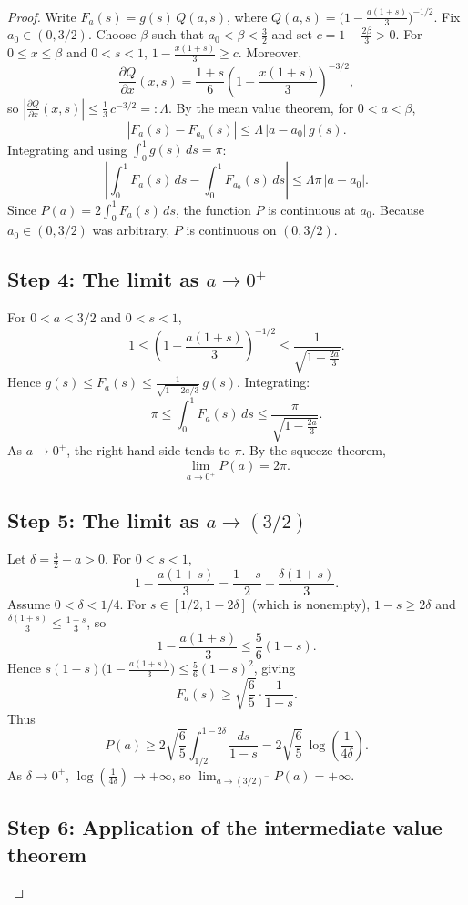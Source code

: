 \documentclass{article}
\begin{document}
\begin{proof}
Write $F_a(s) = g(s)\,Q(a,s)$, where $Q(a,s) = \bigl(1 - \frac{a(1+s)}{3}\bigr)^{-1/2}$. Fix $a_0 \in (0,3/2)$. Choose $\beta$ such that $a_0 < \beta < \frac{3}{2}$ and set $c = 1 - \frac{2\beta}{3} > 0$. For $0 \le x \le \beta$ and $0 < s < 1$, $1 - \frac{x(1+s)}{3} \ge c$. Moreover,
\[
\frac{\partial Q}{\partial x}(x,s) = \frac{1+s}{6}\left(1 - \frac{x(1+s)}{3}\right)^{-3/2},
\]
so $\left|\frac{\partial Q}{\partial x}(x,s)\right| \le \frac{1}{3}\,c^{-3/2} =: \Lambda$. By the mean value theorem, for $0 < a < \beta$,
\[
|F_a(s) - F_{a_0}(s)| \le \Lambda\,|a - a_0|\,g(s).
\]
Integrating and using $\int_0^1 g(s)\,ds = \pi$:
\[
\left|\int_0^1 F_a(s)\,ds - \int_0^1 F_{a_0}(s)\,ds\right| \le \Lambda\pi\,|a - a_0|.
\]
Since $P(a) = 2\int_0^1 F_a(s)\,ds$, the function $P$ is continuous at $a_0$. Because $a_0 \in (0,3/2)$ was arbitrary, $P$ is continuous on $(0,3/2)$.

\subsection*{Step 4: The limit as $a \to 0^+$}

For $0 < a < 3/2$ and $0 < s < 1$,
\[
1 \le \left(1 - \frac{a(1+s)}{3}\right)^{-1/2} \le \frac{1}{\sqrt{1 - \frac{2a}{3}}}.
\]
Hence $g(s) \le F_a(s) \le \frac{1}{\sqrt{1 - 2a/3}}\,g(s)$. Integrating:
\[
\pi \le \int_0^1 F_a(s)\,ds \le \frac{\pi}{\sqrt{1 - \frac{2a}{3}}}.
\]
As $a \to 0^+$, the right-hand side tends to $\pi$. By the squeeze theorem,
\[
\lim_{a \to 0^+} P(a) = 2\pi.
\]

\subsection*{Step 5: The limit as $a \to (3/2)^-$}

Let $\delta = \frac{3}{2} - a > 0$. For $0 < s < 1$,
\[
1 - \frac{a(1+s)}{3} = \frac{1-s}{2} + \frac{\delta(1+s)}{3}.
\]
Assume $0 < \delta < 1/4$. For $s \in [1/2, 1-2\delta]$ (which is nonempty), $1-s \ge 2\delta$ and $\frac{\delta(1+s)}{3} \le \frac{1-s}{3}$, so
\[
1 - \frac{a(1+s)}{3} \le \frac{5}{6}(1-s).
\]
Hence $s(1-s)\bigl(1 - \frac{a(1+s)}{3}\bigr) \le \frac{5}{6}(1-s)^2$, giving
\[
F_a(s) \ge \sqrt{\frac{6}{5}} \cdot \frac{1}{1-s}.
\]
Thus
\[
P(a) \ge 2\sqrt{\frac{6}{5}} \int_{1/2}^{1-2\delta} \frac{ds}{1-s} = 2\sqrt{\frac{6}{5}}\,\log\!\left(\frac{1}{4\delta}\right).
\]
As $\delta \to 0^+$, $\log\!\left(\frac{1}{4\delta}\right) \to +\infty$, so $\lim_{a \to (3/2)^-} P(a) = +\infty$.

\subsection*{Step 6: Application of the intermediate value theorem}


\end{proof}
\end{document}
